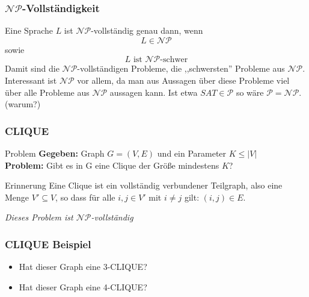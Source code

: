 \documentclass{beamer}
\begin{document}
\begin{frame}
\frametitle{$\mathcal{NP}$-Vollständigkeit}
Eine Sprache $L$ ist $\mathcal{NP}$-vollständig genau dann, wenn
$$L \in \mathcal{NP}$$ sowie $$L\mbox{ ist $\mathcal{NP}$-schwer}$$
Damit sind die $\mathcal{NP}$-vollständigen Probleme, die ,,schwersten'' Probleme aus $\mathcal{NP}$.\\
Interessant ist $\mathcal{NP}$ vor allem, da man aus Aussagen über diese Probleme viel über alle Probleme aus $\mathcal{NP}$ aussagen kann.
Ist etwa $SAT \in \mathcal{P}$ so wäre $\mathcal{P} = \mathcal{NP}$. (warum?)
\end{frame}

\begin{frame}
\frametitle{CLIQUE}
\begin{block}{Problem}
\textbf{Gegeben:} Graph $G = (V, E)$ und ein Parameter $K \leq |V|$\\
\textbf{Problem:} Gibt es in G eine Clique der Größe mindestens $K$?
\end{block}
\begin{block}{Erinnerung}
Eine Clique ist ein vollständig verbundener Teilgraph, also eine Menge $V' \subseteq V$, so dass für alle $i,j \in V'$ mit $i\neq j$ gilt: $(i, j) \in E$.
\end{block}
\textit{Dieses Problem ist $\mathcal{NP}$-vollständig}
\end{frame}

\begin{frame}
\frametitle{CLIQUE Beispiel}
\vspace{-1cm}
\begin{figure}[H]
\end{figure}
\begin{itemize}
\item Hat dieser Graph eine 3-CLIQUE?\pause
\item Hat dieser Graph eine 4-CLIQUE?
\end{itemize}
\end{frame}
\end{document}
